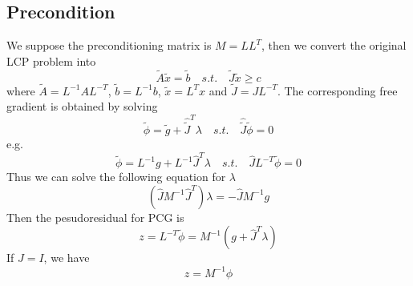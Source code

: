 \documentclass[9pt,twocolumn]{extarticle}
\begin{document}
\subsection{Precondition}
We suppose the preconditioning matrix is $M = LL^T$, then we convert the original LCP problem into
\begin{equation}
  \tilde{A} \tilde{x} = \tilde{b} \quad {s.t.} \quad \tilde{J}\tilde{x} \ge c
\end{equation}
where $\tilde{A} = L^{-1}AL^{-T}$, $\tilde{b} = L^{-1}b$, $\tilde{x} = L^{T}x$ and $\tilde{J} = JL^{-T}$. The corresponding free gradient is obtained by solving
\begin{equation}
  \tilde{\phi} = \tilde{g} + \hat{\tilde{J}}^T\lambda \quad {s.t.} \quad \hat{\tilde{J}}\tilde{\phi} = 0
\end{equation}
e.g.
\begin{equation}
  \tilde{\phi} = L^{-1}g + L^{-1}\hat{J}^T\lambda \quad {s.t.} \quad \hat{J}L^{-T}\tilde{\phi} = 0
\end{equation}
Thus we can solve the following equation for $\lambda$
\begin{equation}
  (\hat{J}M^{-1}\hat{J}^T)\lambda = -\hat{J}M^{-1}g
\end{equation}
Then the pesudoresidual for PCG is 
\begin{equation}
  z = L^{-T}\tilde{\phi} = M^{-1}(g + \hat{J}^T\lambda)
\end{equation}
If $J = I$, we have 
\begin{equation}
  z = M^{-1} \phi
\end{equation}

\end{document}
